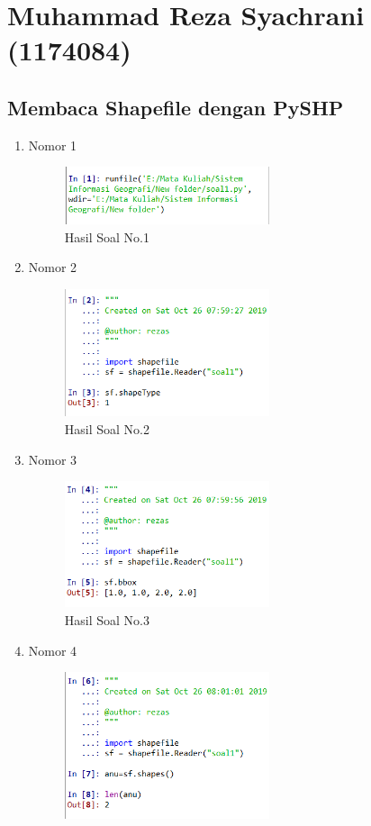 \section{Muhammad Reza Syachrani (1174084)}
\subsection{Membaca Shapefile dengan PySHP}
\begin{enumerate}
	\item Nomor 1
	
	\begin{figure}[H]
		\includegraphics[width=6cm]{figures/Tugas3/1174084/1.png}
		\centering
		\caption{Hasil Soal No.1}
	\end{figure}
	\item Nomor 2
	
	\begin{figure}[H]
		\includegraphics[width=6cm]{figures/Tugas3/1174084/2.png}
		\centering
		\caption{Hasil Soal No.2}
	\end{figure}
	\item Nomor 3
	
	\begin{figure}[H]
		\includegraphics[width=6cm]{figures/Tugas3/1174084/3.png}
		\centering
		\caption{Hasil Soal No.3}
	\end{figure}
	\item Nomor 4
	
	\begin{figure}[H]
		\includegraphics[width=6cm]{figures/Tugas3/1174084/4.png}

\end{figure}
\end{enumerate}
